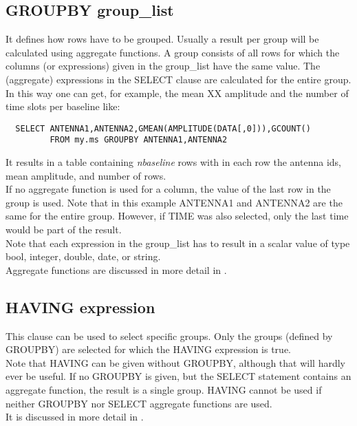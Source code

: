 \subsection{\label{TAQL:GROUPBY}GROUPBY group\_list}
It defines how rows have to be grouped. Usually a result per group
will be calculated using aggregate functions.
A group consists of all rows for which the columns (or expressions)
given in the group\_list have the same value.
The (aggregate) expressions in the SELECT clause are calculated for
the entire group. In this way one can get, for example, the mean XX amplitude
and the number of time slots per baseline like:
\begin{verbatim}
  SELECT ANTENNA1,ANTENNA2,GMEAN(AMPLITUDE(DATA[,0])),GCOUNT()
         FROM my.ms GROUPBY ANTENNA1,ANTENNA2
\end{verbatim} 
It results in a table containing {\it nbaseline} rows with in each row
the antenna ids, mean amplitude, and number of rows.
\\If no aggregate function is used for a column, the value of the last
row in the group is used. Note that in this example ANTENNA1 and
ANTENNA2 are the same for the entire group. However, if TIME was also
selected, only the last time would be part of the result.
\\Note that each expression in the group\_list has to result in a scalar
value of type bool, integer, double, date, or string.
\\Aggregate functions are discussed in more detail in
   . 

\subsection{\label{TAQL:HAVING}HAVING expression}
This clause can be used to select specific groups. Only the groups
(defined by GROUPBY) are selected for which the HAVING 
expression is true. 
\\Note that HAVING can be given without GROUPBY, although that will
hardly ever be useful. If no GROUPBY is given, but the SELECT
statement contains an aggregate function, the result is a single
group.
HAVING cannot be used if neither GROUPBY nor SELECT aggregate
functions are used.
\\It is discussed in more detail in .

